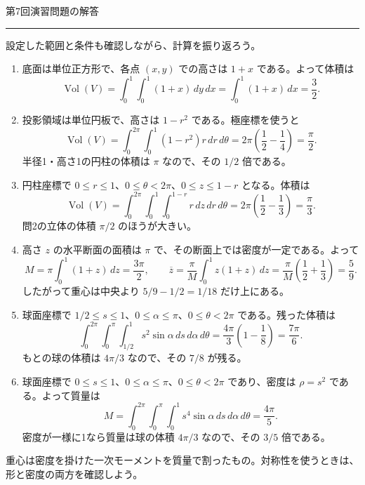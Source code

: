 \documentclass[a4paper,10pt,pdflatex,ja=standard,jafont=ipaex-type1,
  magstyle=real,scale=1]{bxjsarticle}
\newcommand{\handouttitle}[1]{%
  \begin{center}
    {\Large\color{ink}#1}\par\vspace{3mm}
    {\color{accent}\rule{0.88\linewidth}{0.7pt}}
  \end{center}\vspace{-2mm}}
\newcommand{\keybox}[1]{\par\vspace{3pt}\begingroup
  \setlength{\fboxsep}{4pt}%
  \colorbox{soft}{\parbox{\dimexpr\linewidth-2\fboxsep\relax}{\small #1}}%
  \endgroup\par\vspace{2pt}}
\newenvironment{problems}
  {\begin{enumerate}[leftmargin=2em,itemsep=3pt,topsep=3pt,parsep=0pt,
    font=\color{accent}]}
  {\end{enumerate}}
\begin{document}
\newpage
\handouttitle{第7回\quad 演習問題の解答}
{\small 設定した範囲と条件も確認しながら、計算を振り返ろう。}\par
\begin{problems}
\setlength{\itemsep}{7pt}
\item 底面は単位正方形で、各点 $(x,y)$ での高さは $1+x$ である。よって体積は
$$
 \operatorname{Vol}(V)=\int_0^1\int_0^1(1+x)\,dy\,dx
 =\int_0^1(1+x)\,dx=\frac32.
$$

\item 投影領域は単位円板で、高さは $1-r^2$ である。極座標を使うと
$$
 \operatorname{Vol}(V)=\int_0^{2\pi}\int_0^1(1-r^2)r\,dr\,d\theta
 =2\pi\left(\frac12-\frac14\right)=\frac\pi2.
$$
半径1・高さ1の円柱の体積は $\pi$ なので、その $1/2$ 倍である。

\item 円柱座標で $0\le r\le1$、$0\le\theta<2\pi$、$0\le z\le1-r$ となる。体積は
$$
 \operatorname{Vol}(V)
 =\int_0^{2\pi}\int_0^1\int_0^{1-r}r\,dz\,dr\,d\theta
 =2\pi\left(\frac12-\frac13\right)=\frac\pi3.
$$
問2の立体の体積 $\pi/2$ のほうが大きい。

\item 高さ $z$ の水平断面の面積は $\pi$ で、その断面上では密度が一定である。よって
$$
 M=\pi\int_0^1(1+z)\,dz=\frac{3\pi}{2},\qquad
 \overline z=\frac{\pi}{M}\int_0^1z(1+z)\,dz
 =\frac{\pi}{M}\left(\frac12+\frac13\right)=\frac59.
$$
したがって重心は中央より $5/9-1/2=1/18$ だけ上にある。

\item 球面座標で $1/2\le s\le1$、$0\le\alpha\le\pi$、$0\le\theta<2\pi$ である。残った体積は
$$
 \int_0^{2\pi}\int_0^\pi\int_{1/2}^1s^2\sin\alpha\,ds\,d\alpha\,d\theta
 =\frac{4\pi}{3}\left(1-\frac18\right)=\frac{7\pi}{6}.
$$
もとの球の体積は $4\pi/3$ なので、その $7/8$ が残る。

\item 球面座標で $0\le s\le1$、$0\le\alpha\le\pi$、$0\le\theta<2\pi$ であり、密度は $\rho=s^2$ である。よって質量は
$$
 M=\int_0^{2\pi}\int_0^\pi\int_0^1s^4\sin\alpha\,ds\,d\alpha\,d\theta
 =\frac{4\pi}{5}.
$$
密度が一様に1なら質量は球の体積 $4\pi/3$ なので、その $3/5$ 倍である。
\end{problems}
\keybox{重心は密度を掛けた一次モーメントを質量で割ったもの。対称性を使うときは、形と密度の両方を確認しよう。}
\end{document}
